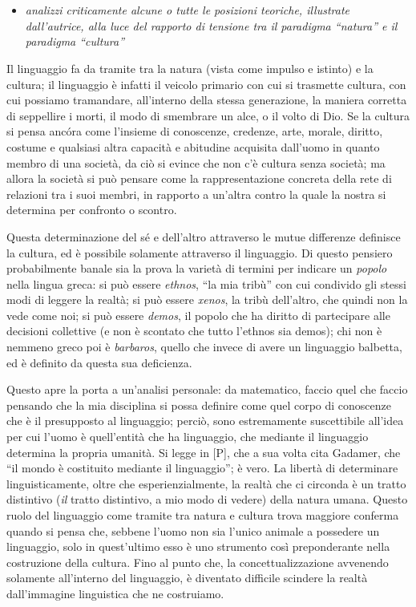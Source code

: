 \documentclass[dvipsnames]{amsart}
\begin{document}
\section{}
\begin{itemize}
  \item \emph{analizzi criticamente alcune o tutte le posizioni teoriche, illustrate dall'autrice, alla luce del rapporto di tensione tra il paradigma ``natura'' e il paradigma ``cultura''} 
\end{itemize} 
Il linguaggio fa da tramite tra la natura (vista come impulso e istinto) e la cultura; il linguaggio è infatti il veicolo primario con cui si trasmette cultura, con cui possiamo tramandare, all'interno della stessa generazione, la maniera corretta di seppellire i morti, il modo di smembrare un alce, o il volto di Dio. Se la cultura si pensa anc\'ora come l'insieme di conoscenze, credenze, arte, morale, diritto, costume e qualsiasi altra capacità e abitudine acquisita dall'uomo in quanto membro di una società, da ciò si evince che non c'è cultura senza società; ma allora la società si può pensare come la rappresentazione concreta della rete di relazioni tra i suoi membri, in rapporto a un'altra contro la quale la nostra si determina per confronto o scontro.

Questa determinazione del sé e dell'altro attraverso le mutue differenze definisce la cultura, ed è possibile solamente attraverso il linguaggio. Di questo pensiero probabilmente banale sia la prova la varietà di termini per indicare un \emph{popolo} nella lingua greca: si può essere \emph{ethnos}, ``la mia tribù'' con cui condivido gli stessi modi di leggere la realtà; si può essere \emph{xenos}, la tribù dell'altro, che quindi non la vede come noi; si può essere \emph{demos}, il popolo che ha diritto di partecipare alle decisioni collettive (e non è scontato che tutto l'ethnos sia demos); chi non è nemmeno greco poi è \emph{barbaros}, quello che invece di avere un linguaggio balbetta, ed è definito da questa sua deficienza.

Questo apre la porta a un'analisi personale: da matematico, faccio quel che faccio pensando che la mia disciplina si possa definire come quel corpo di conoscenze che è il presupposto al linguaggio; perciò, sono estremamente suscettibile all'idea per cui l'uomo è quell'entità che ha linguaggio, che mediante il linguaggio determina la propria umanità. Si legge in [P], che a sua volta cita Gadamer, che ``il mondo è costituito mediante il linguaggio''; è vero. La libertà di determinare linguisticamente, oltre che esperienzialmente, la realtà che ci circonda è un tratto distintivo (\emph{il} tratto distintivo, a mio modo di vedere) della natura umana. Questo ruolo del linguaggio come tramite tra natura e cultura trova maggiore conferma quando si pensa che, sebbene l'uomo non sia l'unico animale a possedere un linguaggio, solo in quest'ultimo esso è uno strumento così preponderante nella costruzione della cultura. Fino al punto che, la concettualizzazione avvenendo solamente all'interno del linguaggio, è diventato difficile scindere la realtà dall'immagine linguistica che ne costruiamo.
\end{document}
